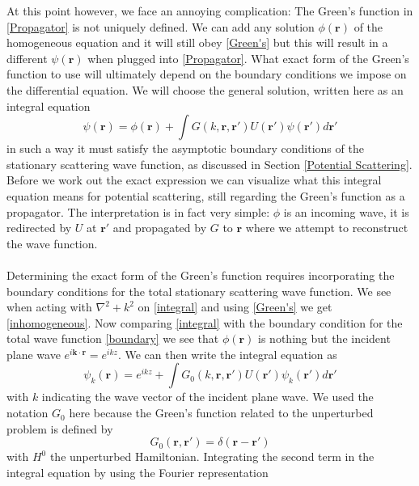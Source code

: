 \documentclass[11pt]{article}
\numberwithin{equation}{section}
\begin{document}
 At this point however, we face an annoying complication: The Green's function in \eqref{Propagator} is not uniquely defined. We can add any solution $\phi(\mathbf{r})$ of the homogeneous equation and it will still obey \eqref{Green's} but this will result in a different $\psi(\mathbf{r})$ when plugged into \eqref{Propagator}. What exact form of the Green's function to use will ultimately depend on the boundary conditions we impose on the differential equation. We will choose the general solution, written here as an integral equation
 \begin{equation}\label{integral}
\psi(\mathbf{r}) = \phi(\mathbf{r}) + \int	 G(k,\mathbf{r},\mathbf{r}')U(\mathbf{r}')\psi(\mathbf{r}')d\mathbf{r}'
\end{equation}
 in such a way it must satisfy the asymptotic boundary conditions of the stationary scattering wave function, as discussed in Section \ref{Potential Scattering}. Before we work out the exact expression we can visualize what this integral equation means for potential scattering, still regarding the Green's function as a propagator. The interpretation is in fact very simple: $\phi$ is an incoming wave, it is redirected by $U$ at $\mathbf{r}'$ and propagated by $G$ to $\mathbf{r}$ where we attempt to reconstruct the wave function.
\\ \\ 
Determining the exact form of the Green's function requires incorporating the boundary conditions for the total stationary scattering wave function. We see when acting with $\nabla^2 + k^2$ on \eqref{integral} and using \eqref{Green's} we get \eqref{inhomogeneous}. Now comparing \eqref{integral} with the boundary condition for the total wave function \eqref{boundary} we see that $\phi(\mathbf{r})$ is nothing but the incident plane wave $e^{i\mathbf{k}\cdot \mathbf{r}} = e^{ikz}$. We can then write the integral equation as
\begin{equation}\label{integral2}
\psi_k(\mathbf{r}) = e^{ikz} + \int	 G_0(k,\mathbf{r},\mathbf{r}')U(\mathbf{r}')\psi_k(\mathbf{r}')d\mathbf{r}'
\end{equation}
with $k$ indicating the wave vector of the incident plane wave. We used the notation $G_0$ here because the Green's function related to the unperturbed problem is defined by
\begin{equation}
[E-H^{0}]G_0(\mathbf{r},\mathbf{r}') = \delta(\mathbf{r}-\mathbf{r}')
\end{equation}
with $H^0$ the unperturbed Hamiltonian.
Integrating the second term in the integral equation by using the Fourier representation
\end{document}
